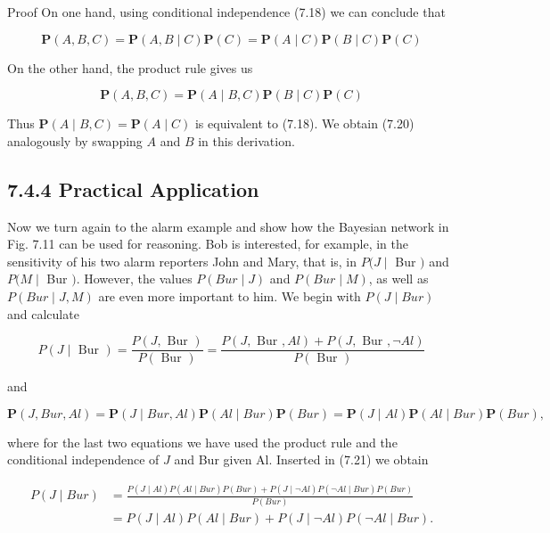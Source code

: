 \documentclass[10pt]{article}
\begin{document}
Proof On one hand, using conditional independence (7.18) we can conclude that

$$
\boldsymbol{P}(A, B, C)=\boldsymbol{P}(A, B \mid C) \boldsymbol{P}(C)=\boldsymbol{P}(A \mid C) \boldsymbol{P}(B \mid C) \boldsymbol{P}(C)
$$

On the other hand, the product rule gives us

$$
\boldsymbol{P}(A, B, C)=\boldsymbol{P}(A \mid B, C) \boldsymbol{P}(B \mid C) \boldsymbol{P}(C)
$$

Thus $\boldsymbol{P}(A \mid B, C)=\boldsymbol{P}(A \mid C)$ is equivalent to (7.18). We obtain (7.20) analogously by swapping $A$ and $B$ in this derivation.

\subsection*{7.4.4 Practical Application}
Now we turn again to the alarm example and show how the Bayesian network in Fig. 7.11 can be used for reasoning. Bob is interested, for example, in the sensitivity of his two alarm reporters John and Mary, that is, in $P(J \mid$ Bur $)$ and $P(M \mid$ Bur $)$. However, the values $P(B u r \mid J)$ and $P(B u r \mid M)$, as well as $P(B u r \mid J, M)$ are even more important to him. We begin with $P(J \mid B u r)$ and calculate


\begin{equation*}
P(J \mid \text { Bur })=\frac{P(J, \text { Bur })}{P(\text { Bur })}=\frac{P(J, \text { Bur }, A l)+P(J, \text { Bur }, \neg A l)}{P(\text { Bur })} \tag{7.21}
\end{equation*}


and


\begin{equation*}
\boldsymbol{P}(J, B u r, A l)=\boldsymbol{P}(J \mid B u r, A l) \boldsymbol{P}(A l \mid B u r) \boldsymbol{P}(B u r)=\boldsymbol{P}(J \mid A l) \boldsymbol{P}(A l \mid B u r) \boldsymbol{P}(B u r), \tag{7.22}
\end{equation*}


where for the last two equations we have used the product rule and the conditional independence of $J$ and Bur given Al. Inserted in (7.21) we obtain


\begin{align*}
P(J \mid B u r) & =\frac{P(J \mid A l) P(A l \mid B u r) P(B u r)+P(J \mid \neg A l) P(\neg A l \mid B u r) P(B u r)}{P(B u r)}  \tag{7.23}\\
& =P(J \mid A l) P(A l \mid B u r)+P(J \mid \neg A l) P(\neg A l \mid B u r) .
\end{align*}
\end{document}
